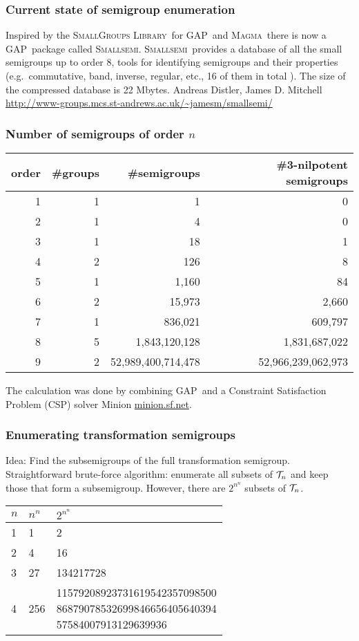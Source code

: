 \documentclass{beamer}
\newcommand{\cT}{{\cal T}}
\newcommand{\Magma}{\textsc{Magma}}
\newcommand{\GAP}{\textsc{GAP}}
\newcommand{\Smallsemi}{\textsc{Smallsemi}}
\newcommand{\jump}{\vskip6pt}
\newcommand{\jmp}{\vskip3pt}
\begin{document}
\begin{frame}\frametitle{Current state of semigroup enumeration}
Inspired by the  \textsc{SmallGroups Library}\ for \GAP\ and \Magma\ there is now a \GAP\ package called \Smallsemi.
\jump
\Smallsemi\ provides a database of all the small semigroups up to order 8, tools for identifying semigroups and their properties (e.g.\ commutative, band, inverse, regular, etc., 16 of them in total ).  
\jump
The size of the compressed database is 22 Mbytes.
\jump
Andreas Distler, James D. Mitchell
\jmp
\url{http://www-groups.mcs.st-andrews.ac.uk/~jamesm/smallsemi/}
\end{frame}

\begin{frame}\frametitle{Number of semigroups of order $n$}
\begin{center}
\begin{tabular}{r|r|r|r}
order & \#groups &\#semigroups &\#3-nilpotent semigroups \\
\hline
1&1&1 &0\\
2&1&4 &0\\
3&1&18&1\\
4&2&126&8\\
5&1&1,160&84\\
6&2&15,973&2,660\\
7&1&836,021&609,797\\
8&5&1,843,120,128&1,831,687,022\\
9&2&52,989,400,714,478&52,966,239,062,973
\end{tabular}
\end{center}
The calculation was done by combining \GAP\ and a Constraint Satisfaction Problem (CSP) solver Minion \url{minion.sf.net}.
\end{frame}

\begin{frame}\frametitle{Enumerating transformation semigroups}
Idea: Find the subsemigroups of the full transformation semigroup.
\jump
Straightforward brute-force algorithm: enumerate all subsets of $\cT_n$ and keep those that form a subsemigroup.
\jump
However, there are $2^{n^n}$ subsets of $\cT_n$.
\begin{center}
\renewcommand{\arraystretch}{1.5}

\begin{tabular}{l|l|l}
$n$&$n^n$&$2^{n^n}$\\
\hline
1 & 1 & 2 \\
\hline
2 & 4 & 16 \\
\hline
3 & 27 & 134217728 \\
\hline\hline\hline
4 & 256 & \parbox[l]{.5\textwidth}{11579208923731619542357098500\\86879078532699846656405640394\\57584007913129639936}\\
 & 3125 & $2^{3125}$
\end{tabular}
\end{center}
\end{frame}
\end{document}
